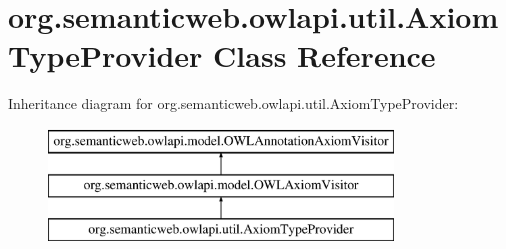 \hypertarget{classorg_1_1semanticweb_1_1owlapi_1_1util_1_1_axiom_type_provider}{\section{org.\-semanticweb.\-owlapi.\-util.\-Axiom\-Type\-Provider Class Reference}
\label{classorg_1_1semanticweb_1_1owlapi_1_1util_1_1_axiom_type_provider}
}
Inheritance diagram for org.\-semanticweb.\-owlapi.\-util.\-Axiom\-Type\-Provider\-:\begin{figure}[H]
\begin{center}
\leavevmode
\includegraphics[height=3.000000cm]{classorg_1_1semanticweb_1_1owlapi_1_1util_1_1_axiom_type_provider}
\end{center}
\end{figure}
